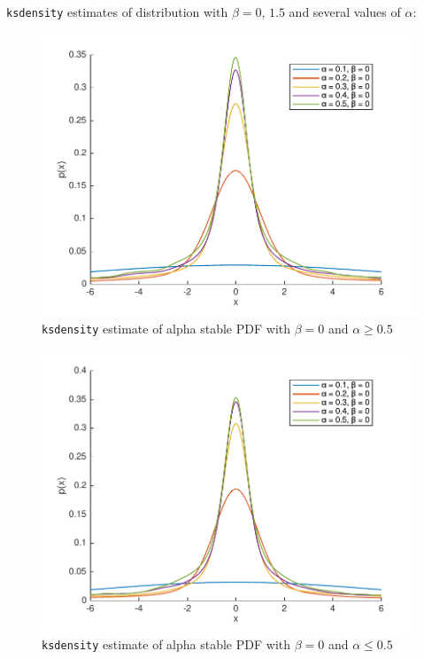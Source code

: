 \documentclass[12pt]{article}
\newcommand{\code}[1]{\texttt{#1}}
\begin{document}
\begin{enumerate}
\code{ksdensity} estimates of distribution with $\beta=0,\,1.5$ and several values of $\alpha$:

\begin{figure}[H]
\includegraphics[width=\textwidth]{figures/beta-0-with-several-large-alpha.pdf}
  \caption{\code{ksdensity} estimate of alpha stable PDF with $\beta = 0$ and $\alpha \ge 0.5$ }
\end{figure}

\begin{figure}[H]
\includegraphics[width=\textwidth]{figures/beta-0-with-several-small-alpha.pdf}
  \caption{\code{ksdensity} estimate of alpha stable PDF with $\beta = 0$ and $\alpha \leq 0.5$ }
\end{figure}


\end{enumerate}
\end{document}
